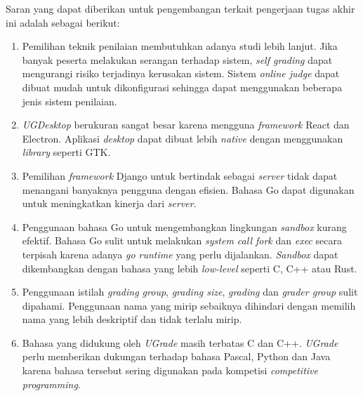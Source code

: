 \par Saran yang dapat diberikan untuk pengembangan terkait pengerjaan tugas akhir ini adalah sebagai berikut:
\begin{enumerate}
    \item Pemilihan teknik penilaian membutuhkan adanya studi lebih lanjut. Jika banyak peserta melakukan serangan terhadap sistem, \textit{self grading} dapat mengurangi risiko terjadinya kerusakan sistem. Sistem \textit{online judge} dapat dibuat mudah untuk dikonfigurasi sehingga dapat menggunakan beberapa jenis sistem penilaian.
    \item \textit{UGDesktop} berukuran sangat besar karena mengguna \textit{framework} React dan Electron. Aplikasi \textit{desktop} dapat dibuat lebih \textit{native} dengan menggunakan \textit{library} seperti GTK.
    \item Pemilihan \textit{framework} Django untuk bertindak sebagai \textit{server} tidak dapat menangani banyaknya pengguna dengan efisien. Bahasa Go dapat digunakan untuk meningkatkan kinerja dari \textit{server}.
    \item Penggunaan bahasa Go untuk mengembangkan lingkungan \textit{sandbox} kurang efektif. Bahasa Go sulit untuk melakukan \textit{system call fork} dan \textit{exec} secara terpisah karena adanya \textit{go runtime} yang perlu dijalankan. \textit{Sandbox} dapat dikembangkan dengan bahasa yang lebih \textit{low-level} seperti C, C++ atau Rust. 
    \item Penggunaan istilah \textit{grading group}, \textit{grading size}, \textit{grading} dan \textit{grader group} sulit dipahami. Penggunaan nama yang mirip sebaiknya dihindari dengan memilih nama yang lebih deskriptif dan tidak terlalu mirip. 
    \item Bahasa yang didukung oleh \textit{UGrade} masih terbatas C dan C++. \textit{UGrade} perlu memberikan dukungan terhadap bahasa Pascal, Python dan Java karena bahasa tersebut sering digunakan pada kompetisi \textit{competitive programming}.
\end{enumerate}